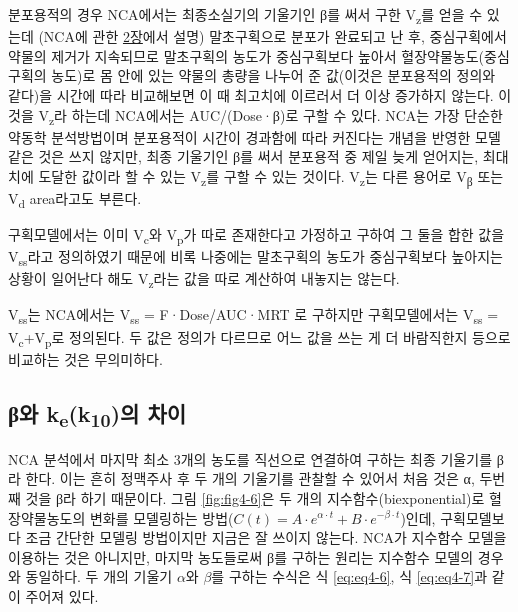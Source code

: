 \documentclass[
  11pt,
  krantz2, a4paper, twoside]{krantz}
\theoremstyle{definition}
\theoremstyle{definition}
\theoremstyle{definition}
\theoremstyle{definition}
\theoremstyle{remark}
\begin{document}
분포용적의 경우 NCA에서는 최종소실기의 기울기인 β를 써서 구한 V\textsubscript{z}를
얻을 수 있는데 (NCA에 관한 \protect\hyperlink{nca-principle}{2장}에서 설명) 말초구획으로 분포가 완료되고 난
후, 중심구획에서 약물의 제거가 지속되므로 말초구획의 농도가 중심구획보다
높아서 혈장약물농도(중심구획의 농도)로 몸 안에 있는 약물의 총량을 나누어
준 값(이것은 분포용적의 정의와 같다)을 시간에 따라 비교해보면 이 때
최고치에 이르러서 더 이상 증가하지 않는다. 이것을 V\textsubscript{z}라 하는데
NCA에서는 AUC/(Dose·β)로 구할 수 있다. NCA는 가장 단순한 약동학
분석방법이며 분포용적이 시간이 경과함에 따라 커진다는 개념을 반영한 모델
같은 것은 쓰지 않지만, 최종 기울기인 β를 써서 분포용적 중 제일 늦게
얻어지는, 최대치에 도달한 값이라 할 수 있는 V\textsubscript{z}를 구할 수 있는 것이다. V\textsubscript{z}는 다른
용어로 V\textsubscript{β} 또는 V\textsubscript{d} area라고도 부른다.

구획모델에서는 이미 V\textsubscript{c}와 V\textsubscript{p}가 따로 존재한다고 가정하고 구하여 그
둘을 합한 값을 V\textsubscript{ss}라고 정의하였기 때문에 비록 나중에는 말초구획의
농도가 중심구획보다 높아지는 상황이 일어난다 해도 V\textsubscript{z}라는 값을 따로
계산하여 내놓지는 않는다.

V\textsubscript{ss}는 NCA에서는 V\textsubscript{ss} = F·Dose/AUC·MRT 로 구하지만 구획모델에서는
V\textsubscript{ss} = V\textsubscript{c}+V\textsubscript{p}로 정의된다. 두 값은 정의가 다르므로 어느 값을 쓰는 게
더 바람직한지 등으로 비교하는 것은 무의미하다.

\hypertarget{ux3b2uxc640-kek10uxc758-uxcc28uxc774}{%
\subsection{\texorpdfstring{β와 k\textsubscript{e}(k\textsubscript{10})의 차이}{β와 ke(k10)의 차이}}\label{ux3b2uxc640-kek10uxc758-uxcc28uxc774}}

NCA 분석에서 마지막 최소 3개의 농도를 직선으로 연결하여 구하는 최종 기울기를 β라 한다.
이는 흔히 정맥주사 후 두 개의 기울기를 관찰할 수 있어서 처음 것은 α, 두번째 것을 β라 하기 때문이다.
그림 \ref{fig:fig4-6}은 두 개의 지수함수(biexponential)로 혈장약물농도의 변화를 모델링하는 방법(\(C(t) = A \cdot e^{\alpha \cdot t} + B \cdot e^{-\beta \cdot t}\))인데, 구획모델보다 조금 간단한 모델링 방법이지만 지금은 잘 쓰이지 않는다.
NCA가 지수함수 모델을 이용하는 것은 아니지만, 마지막 농도들로써 β를 구하는 원리는 지수함수 모델의 경우와 동일하다.
두 개의 기울기 \(\alpha\)와 \(\beta\)를 구하는 수식은 식 \eqref{eq:eq4-6}, 식 \eqref{eq:eq4-7}과 같이 주어져 있다.
\end{document}
